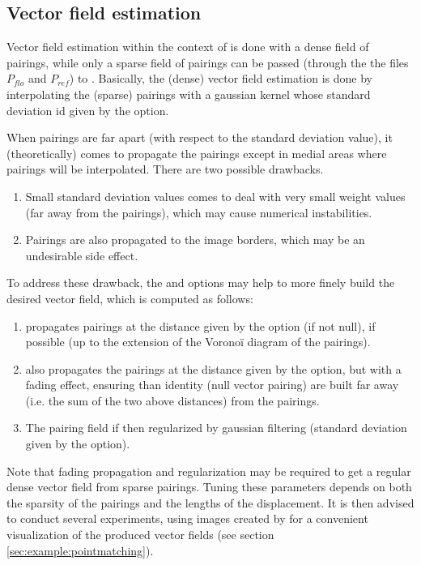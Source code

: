 \subsection{Vector field estimation}

Vector field estimation within the context of \blockmatching is done with a dense field of pairings, while only a sparse field of pairings can be passed (through the the files $P_{flo}$ and  $P_{ref}$) to \pointmatching. 
Basically, the (dense) vector field estimation is done by interpolating the (sparse) pairings with a gaussian kernel whose standard deviation id given by the  option.

When pairings are far apart (with respect to the standard deviation value), it (theoretically) comes to propagate the pairings except in medial areas where pairings will be interpolated. There are two possible drawbacks.
\begin{enumerate}
\item Small standard deviation values comes to deal with very small weight values (far away from the pairings), which may cause numerical instabilities.  
\item Pairings are also propagated to the image borders, which may be an undesirable side effect.
\end{enumerate}
 
To address these drawback, the  and  options may help to more finely build the desired vector field, which is computed as follows:
\begin{enumerate}
\item {} propagates pairings at the distance given by the  option (if not null), if possible (up to the extension of the Vorono\"i diagram of the pairings).
\item {} also propagates the pairings at the distance given by the option, but with a fading effect, ensuring than identity (null vector pairing) are built far away (i.e. the sum of the two above distances) from the pairings.
\item The pairing field if then regularized by gaussian filtering (standard deviation given by the  option).
\end{enumerate}
Note that fading propagation and regularization may be required to get a regular dense vector field from sparse pairings. Tuning these parameters depends on both the sparsity of the pairings and the lengths of the displacement. It is then advised to conduct several experiments, using images created by \createGrid for a convenient visualization of the produced vector fields (see section \ref{sec:example:pointmatching}).



